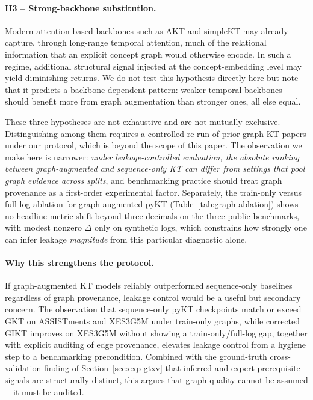 \documentclass[pdflatex,sn-basic]{sn-jnl}
\begin{document}
\paragraph{H3 -- Strong-backbone substitution.}
Modern attention-based backbones such as AKT and simpleKT may already
capture, through long-range temporal attention, much of the relational
information that an explicit concept graph would otherwise encode. In
such a regime, additional structural signal injected at the
concept-embedding level may yield diminishing returns. We do not test
this hypothesis directly here but note that it predicts a
backbone-dependent pattern: weaker temporal backbones should benefit
more from graph augmentation than stronger ones, all else equal.

These three hypotheses are not exhaustive and are not mutually
exclusive. Distinguishing among them requires a controlled re-run of
prior graph-KT papers under our protocol, which is beyond the scope
of this paper. The observation we make here is narrower:
\emph{under leakage-controlled evaluation, the absolute ranking between
graph-augmented and sequence-only KT can differ from settings that pool graph
evidence across splits}, and benchmarking practice should treat graph provenance
as a first-order experimental factor.
Separately, the train-only versus full-log ablation for graph-augmented pyKT
(Table~\ref{tab:graph-ablation}) shows no headline metric shift beyond three decimals
on the three public benchmarks, with modest nonzero $\Delta$ only on synthetic logs,
which constrains how strongly one can infer leakage \emph{magnitude} from this
particular diagnostic alone.

\paragraph{Why this strengthens the protocol.}
If graph-augmented KT models reliably outperformed sequence-only
baselines regardless of graph provenance, leakage control would be a
useful but secondary concern.
The observation that sequence-only pyKT checkpoints match or exceed GKT on
ASSISTments and XES3G5M under train-only graphs, while corrected GIKT improves on
XES3G5M without showing a train-only/full-log gap, together with explicit auditing of edge
provenance, elevates leakage control from a hygiene step to a benchmarking
precondition.
Combined with the ground-truth cross-validation finding of Section~\ref{sec:exp-gtxv}
that inferred and expert prerequisite signals are structurally
distinct, this argues that graph quality cannot be assumed---it must
be audited.
\end{document}
